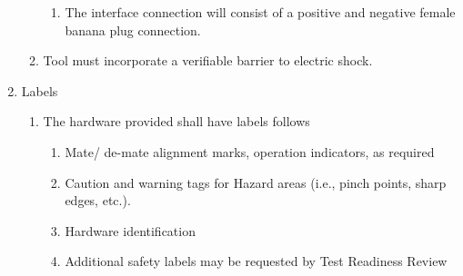 \documentclass{article}
\begin{document}
\begin{enumerate}
\begin{enumerate}
\begin{enumerate}
            \item The interface connection will consist of a positive and negative female banana plug connection.
        \end{enumerate}
        \item Tool must incorporate a verifiable barrier to electric shock.
    \end{enumerate}
    \item Labels
    \begin{enumerate}
        \item The hardware provided shall have labels follows
        \begin{enumerate}
            \item Mate/ de-mate alignment marks, operation indicators, as required
            \item Caution and warning tags for Hazard areas (i.e., pinch points, sharp edges, etc.).
            \item Hardware identification
            \item Additional safety labels may be requested by Test Readiness Review
        \end{enumerate}
    \end{enumerate}
\end{enumerate}
\end{document}
